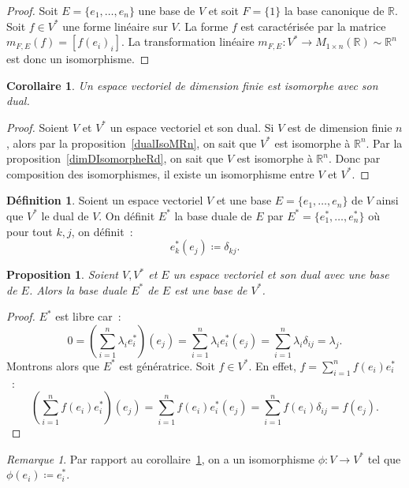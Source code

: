 \documentclass{article}
\newcommand{\R}{\mathbb R}
\newcommand{\M}[3]{M_{#1 \times #2}(#3)}
\newtheorem{prp}[thm]{Proposition}
\newtheorem{cor}[thm]{Corollaire}
\theoremstyle{definition}
\newtheorem{déf}[thm]{Définition}
\theoremstyle{remark}
\newtheorem*{rmq}{Remarque}
\begin{document}
		\begin{proof} Soit $E = \{e_1, \dotsc, e_n\}$ une base de $V$ et soit $F = \{1\}$ la base canonique de $\R$. Soit $f \in V^*$ une forme linéaire sur $V$.
		La forme $f$ est caractérisée par la matrice $m_{F, E}(f) = [f(e_i)_i]$. La transformation linéaire $m_{F, E} : V^* \to \M 1n\R \sim \R^n$ est donc un
		isomorphisme. \end{proof}

		\begin{cor}\label{VisoMV*} Un espace vectoriel de dimension finie est isomorphe avec son dual. \end{cor}

		\begin{proof} Soient $V$ et $V^*$ un espace vectoriel et son dual. Si $V$ est de dimension finie $n$, alors par la proposition~\ref{dualIsoMRn}, on sait que
		$V^*$ est isomorphe à $\R^n$. Par la proposition~\ref{dimDIsomorpheRd}, on sait que $V$ est isomorphe à $\R^n$. Donc par composition des isomorphismes, il
		existe un isomorphisme entre $V$ et $V^*$. \end{proof}

		\begin{déf} Soient un espace vectoriel $V$ et une base $E = \{e_1, \dotsc, e_n\}$ de $V$ ainsi que $V^*$ le dual de $V$. On définit $E^*$ la base duale de $E$ par
		$E^* = \{e_1^*, \dotsc, e_n^*\}$ où pour tout $k, j$, on définit~: \[e_k^*(e_j) \coloneqq \delta_{kj}.\] \end{déf}

		\begin{prp} Soient $V, V^*$ et $E$ un espace vectoriel et son dual avec une base de $E$. Alors la base duale $E^*$ de $E$ est une base de $V^*$. \end{prp}

		\begin{proof} $E^*$ est libre car~: \[0 = \left(\sum_{i=1}^n\lambda_ie_i^*\right)(e_j) = \sum_{i=1}^n\lambda_ie_i^*(e_j) = \sum_{i=1}^n\lambda_i\delta_{ij}
		= \lambda_j.\] Montrons alors que $E^*$ est génératrice. Soit $f \in V^*$. En effet, $f = \sum_{i=1}^nf(e_i)e_i^*$~:
		\[\left(\sum_{i=1}^nf(e_i)e_i^*\right)(e_j) = \sum_{i=1}^nf(e_i)e_i^*(e_j) = \sum_{i=1}^nf(e_i)\delta_{ij} = f(e_j).\] \end{proof}

		\begin{rmq} Par rapport au corollaire~\ref{VisoMV*}, on a un isomorphisme $\phi : V \to V^*$ tel que $\phi(e_i) \coloneqq e_i^*$. \end{rmq}
\end{document}
